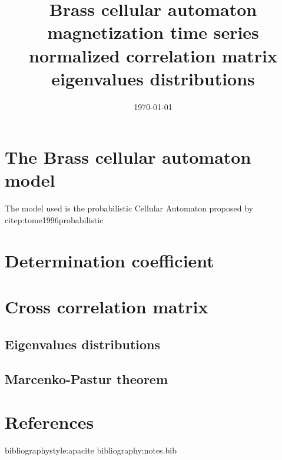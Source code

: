\documentclass[a4paper]{article}
\date{\today}
\title{Brass cellular automaton magnetization time series normalized correlation matrix eigenvalues distributions}
\begin{document}
\maketitle

\section{The Brass cellular automaton model}
\label{sec:org0c52bb4}

The model used is the probabilistic Cellular Automaton proposed by citep:tome1996probabilistic

\section{Determination coefficient}
\label{sec:orgbaa967f}




\section{Cross correlation matrix}
\label{sec:org3b1e8f4}




\subsection{Eigenvalues distributions}
\label{sec:org8092a98}




\subsection{Marcenko-Pastur theorem}
\label{sec:orga26bf46}


\section{References}
\label{sec:org3d87e5d}

bibliographystyle:apacite
bibliography:notes.bib
\end{document}
